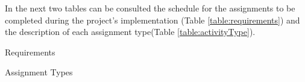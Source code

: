 In the next two tables can be consulted the schedule for the assignments to be completed during the project's implementation (Table \ref{table:requirements}) and the description of each assignment type(Table \ref{table:activityType}).
\begin{center}
	\begin{table}[H]
  		\caption{Requirements}
  		\label{table:requirements}
	\end{table}
\end{center}

\begin{center}
	\begin{table}[H]
  		\caption{Assignment Types}
  		\label{table:activityType}
	\end{table}
\end{center}